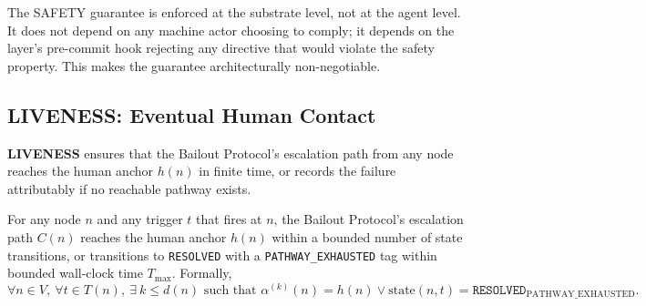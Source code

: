 The SAFETY guarantee is enforced at the substrate level, not at the agent level.
It does not depend on any machine actor choosing to comply; it depends on the
\fact{} layer's pre-commit hook rejecting any directive that would violate the
safety property.  This makes the guarantee architecturally non-negotiable.

\subsection{LIVENESS: Eventual Human Contact}
\label{sec:liveness}

\textbf{LIVENESS} ensures that the Bailout Protocol's escalation path from any
node reaches the human anchor $h(n)$ in finite time, or records the failure
attributably if no reachable pathway exists.

\begin{theorem}
\label{th:liveness}
For any node $n$ and any trigger $t$ that fires at $n$, the Bailout Protocol's
escalation path $C(n)$ reaches the human anchor $h(n)$ within a bounded number
of state transitions, or transitions to \texttt{RESOLVED} with a
\texttt{PATHWAY\_EXHAUSTED} tag within bounded wall-clock time $T_{\max}$.
Formally,
\[
\forall n \in V,\ \forall t \in T(n),\ \exists\ k \leq d(n) \text{ such that }
\alpha^{(k)}(n) = h(n) \lor \text{state}(n, t) = \texttt{RESOLVED}_{\text{PATHWAY\_EXHAUSTED}}.
\]
\end{theorem}

